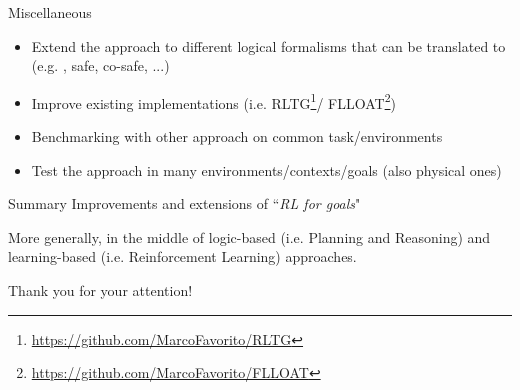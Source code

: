 \documentclass{beamer}
\begin{document}
\begin{frame}{Miscellaneous}
	\begin{itemize}
		\item Extend the approach to different logical formalisms that can be translated to \DFA (e.g. \PLTL, \LTL safe, \LTL co-safe, ...)
		\item Improve existing implementations (i.e. RLTG\footnote{\url{https://github.com/MarcoFavorito/RLTG}}/ FLLOAT\footnote{\url{https://github.com/MarcoFavorito/FLLOAT}})
		\item Benchmarking with other approach on common task/environments
		\item Test the approach in many environments/contexts/goals (also physical ones)
	\end{itemize}

\end{frame}

\begin{frame}{Summary}
		Improvements and extensions of ``\emph{RL for \LLf goals}"
		
		\vspace{0.5cm}
		
		More generally, in the middle of logic-based (i.e. Planning and Reasoning) and learning-based (i.e. Reinforcement Learning) approaches.
	
\end{frame}

\begin{frame}
	\begin{center}
	Thank you for your attention!
	\end{center}
\end{frame}
\end{document}
